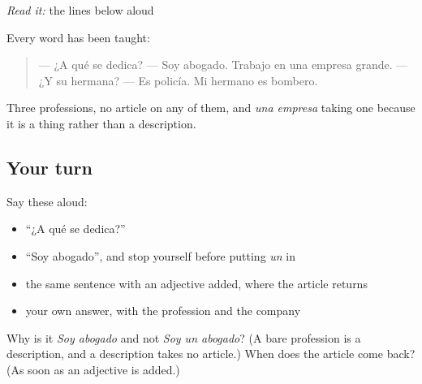 \begin{tcolorbox}[breakable,skin=enhanced,colback=orange!6,colframe=orange!45!black,boxrule=0.5pt,arc=1mm,left=6pt,right=6pt,top=4pt,bottom=4pt,fonttitle=\bfseries,title={Read this}]
\emph{Read it:} the lines below aloud

Every word has been taught:

\begin{quote}
— ¿A qué se dedica? — Soy abogado. Trabajo en una empresa grande. — ¿Y su hermana? — Es policía. Mi hermano es bombero.
\end{quote}

Three professions, no article on any of them, and \emph{una empresa} taking one because it is a thing rather than a description.
\end{tcolorbox}

\subsection*{Your turn}
Say these aloud:

\begin{itemize}
\raggedright
  \item \textquotedblleft{}¿A qué se dedica?\textquotedblright{}
  \item \textquotedblleft{}Soy abogado\textquotedblright{}, and stop yourself before putting \emph{un} in
  \item the same sentence with an adjective added, where the article returns
  \item your own answer, with the profession and the company
\end{itemize}

\begin{tcolorbox}[breakable,colback=teal!4,colframe=teal!35!black,title={Before you move on}]
Why is it \emph{Soy abogado} and not \emph{Soy un abogado}? (A bare profession is a description, and a description takes no article.) When does the article come back? (As soon as an adjective is added.)
\end{tcolorbox}
